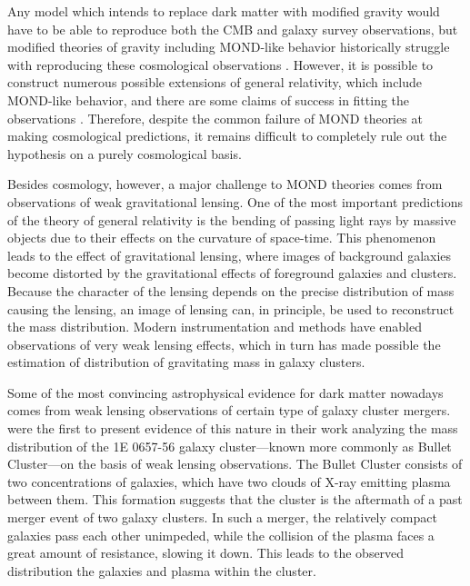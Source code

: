 \documentclass[b5paper, 10pt, twoside]{book}
\begin{document}
Any model which intends to replace dark matter with modified gravity would have to be able to reproduce both the CMB and galaxy survey observations, but modified theories of gravity including MOND-like behavior historically struggle with reproducing these cosmological observations \parencites{XuWangZhang2015, TanWoodard2018, ZlosnikSkordis2017}. However, it is possible to construct numerous possible extensions of general relativity, which include MOND-like behavior, and there are some claims of success in fitting the observations \parencite{SkordisZlosnik2021}. Therefore, despite the common failure of MOND theories at making cosmological predictions, it remains difficult to completely rule out the hypothesis on a purely cosmological basis.

Besides cosmology, however, a major challenge to MOND theories comes from observations of weak gravitational lensing. One of the most important predictions of the theory of general relativity is the bending of passing light rays by massive objects due to their effects on the curvature of space-time. This phenomenon leads to the effect of gravitational lensing, where images of background galaxies become distorted by the gravitational effects of foreground galaxies and clusters. Because the character of the lensing depends on the precise distribution of mass causing the lensing, an image of lensing can, in principle, be used to reconstruct the mass distribution. Modern instrumentation and methods have enabled observations of very weak lensing effects, which in turn has made possible the estimation of distribution of gravitating mass in galaxy clusters.

Some of the most convincing astrophysical evidence for dark matter nowadays comes from weak lensing observations of certain type of galaxy cluster mergers. \textcite{CloweEtAl2006} were the first to present evidence of this nature in their work analyzing the mass distribution of the 1E 0657-56 galaxy cluster---known more commonly as Bullet Cluster---on the basis of weak lensing observations. The Bullet Cluster consists of two concentrations of galaxies, which have two clouds of X-ray emitting plasma between them. This formation suggests that the cluster is the aftermath of a past merger event of two galaxy clusters. In such a merger, the relatively compact galaxies pass each other unimpeded, while the collision of the plasma faces a great amount of resistance, slowing it down. This leads to the observed distribution the galaxies and plasma within the cluster.
\end{document}
